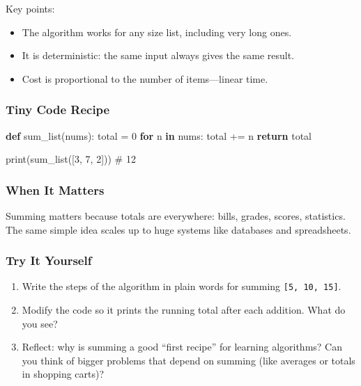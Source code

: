 \documentclass[
  letterpaper,
  DIV=11,
  numbers=noendperiod]{scrreprt}
\newenvironment{Shaded}{\begin{snugshade}}{\end{snugshade}}
\newcommand{\BuiltInTok}[1]{\textcolor[rgb]{0.00,0.23,0.31}{#1}}
\newcommand{\CommentTok}[1]{\textcolor[rgb]{0.37,0.37,0.37}{#1}}
\newcommand{\ControlFlowTok}[1]{\textcolor[rgb]{0.00,0.23,0.31}{\textbf{#1}}}
\newcommand{\DecValTok}[1]{\textcolor[rgb]{0.68,0.00,0.00}{#1}}
\newcommand{\KeywordTok}[1]{\textcolor[rgb]{0.00,0.23,0.31}{\textbf{#1}}}
\newcommand{\NormalTok}[1]{\textcolor[rgb]{0.00,0.23,0.31}{#1}}
\newcommand{\OperatorTok}[1]{\textcolor[rgb]{0.37,0.37,0.37}{#1}}
\providecommand{\tightlist}{%
  \setlength{\itemsep}{0pt}\setlength{\parskip}{0pt}}
\begin{document}
Key points:

\begin{itemize}
\tightlist
\item
  The algorithm works for any size list, including very long ones.
\item
  It is deterministic: the same input always gives the same result.
\item
  Cost is proportional to the number of items---linear time.
\end{itemize}

\subsubsection{Tiny Code Recipe}\label{tiny-code-recipe-89}

\begin{Shaded}
\begin{Highlighting}[]
\KeywordTok{def}\NormalTok{ sum\_list(nums):}
\NormalTok{    total }\OperatorTok{=} \DecValTok{0}
    \ControlFlowTok{for}\NormalTok{ n }\KeywordTok{in}\NormalTok{ nums:}
\NormalTok{        total }\OperatorTok{+=}\NormalTok{ n}
    \ControlFlowTok{return}\NormalTok{ total}

\BuiltInTok{print}\NormalTok{(sum\_list([}\DecValTok{3}\NormalTok{, }\DecValTok{7}\NormalTok{, }\DecValTok{2}\NormalTok{]))   }\CommentTok{\# 12}
\end{Highlighting}
\end{Shaded}

\subsubsection{When It Matters}\label{when-it-matters-89}

Summing matters because totals are everywhere: bills, grades, scores,
statistics. The same simple idea scales up to huge systems like
databases and spreadsheets.

\subsubsection{Try It Yourself}\label{try-it-yourself-91}

\begin{enumerate}
\def\labelenumi{\arabic{enumi}.}
\tightlist
\item
  Write the steps of the algorithm in plain words for summing
  \texttt{{[}5,\ 10,\ 15{]}}.
\item
  Modify the code so it prints the running total after each addition.
  What do you see?
\item
  Reflect: why is summing a good ``first recipe'' for learning
  algorithms? Can you think of bigger problems that depend on summing
  (like averages or totals in shopping carts)?
\end{enumerate}
\end{document}
